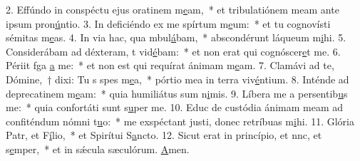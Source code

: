 2. Effúndo in conspéctu ejus oratinem m\uline{e}am,~* et tribulatiónem meam ante ipsum pron\uline{ú}ntio.
3. In deficiéndo ex me spírtum m\uline{e}um:~* et tu cognovísti sémitas m\uline{e}as.
4. In via hac, qua mbul\uline{á}bam,~* abscondérunt láqueum m\uline{i}hi.
5. Considerábam ad déxteram, t vid\uline{é}bam:~* et non erat qui cognóscer\uline{e}t me.
6. Périit fga \uline{a} me:~* et non est qui requírat ánimam m\uline{e}am.
7. Clamávi ad te, Dómine,~† dixi: Tu s spes m\uline{e}a,~* pórtio mea in terra viv\uline{é}ntium.
8. Inténde ad deprecatinem m\uline{e}am:~* quia humiliátus sum n\uline{i}mis.
9. Líbera me a persentib\uline{u}s me:~* quia confortáti sunt s\uline{u}per me.
10. Educ de custódia ánimam meam ad confiténdum nómni t\uline{u}o:~* me exspéctant justi, donec retríbuas m\uline{i}hi.
11. Glória Patr, et F\uline{í}lio,~* et Spirítui S\uline{a}ncto.
12. Sicut erat in princípio, et nnc, et s\uline{e}mper,~* et in sǽcula sæculórum. \uline{A}men.
